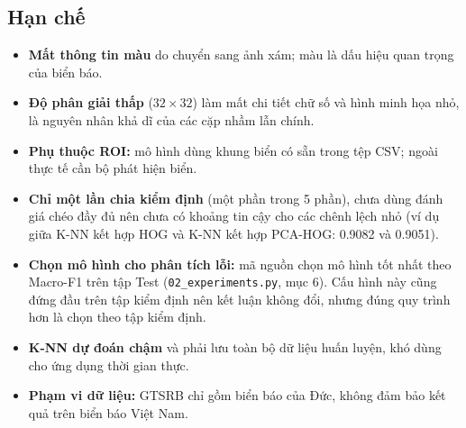 \subsection{Hạn chế}
\label{sec:han-che}

\begin{itemize}
    \item \textbf{Mất thông tin màu} do chuyển sang ảnh xám; màu là dấu hiệu quan trọng của biển báo.
    \item \textbf{Độ phân giải thấp} ($32\times32$) làm mất chi tiết chữ số và hình minh họa nhỏ, là nguyên nhân khả dĩ của các cặp nhầm lẫn chính.
    \item \textbf{Phụ thuộc ROI:} mô hình dùng khung biển có sẵn trong tệp CSV; ngoài thực tế cần bộ phát hiện biển.
    \item \textbf{Chỉ một lần chia kiểm định} (một phần trong 5 phần), chưa dùng đánh giá chéo đầy đủ nên chưa có khoảng tin cậy cho các chênh lệch nhỏ (ví dụ giữa K-NN kết hợp HOG và K-NN kết hợp PCA-HOG: 0.9082 và 0.9051).
    \item \textbf{Chọn mô hình cho phân tích lỗi:} mã nguồn chọn mô hình tốt nhất theo Macro-F1 trên tập Test (\texttt{02\_experiments.py}, mục 6). Cấu hình này cũng đứng đầu trên tập kiểm định nên kết luận không đổi, nhưng đúng quy trình hơn là chọn theo tập kiểm định.
    \item \textbf{K-NN dự đoán chậm} và phải lưu toàn bộ dữ liệu huấn luyện, khó dùng cho ứng dụng thời gian thực.
    \item \textbf{Phạm vi dữ liệu:} GTSRB chỉ gồm biển báo của Đức, không đảm bảo kết quả trên biển báo Việt Nam.
\end{itemize}
